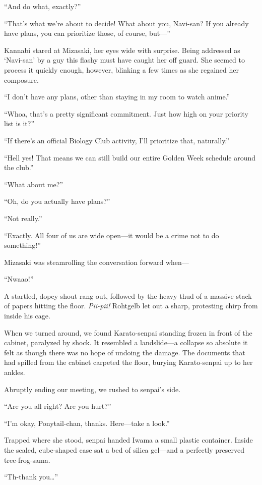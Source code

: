 \documentclass[
    a4paper,
    12pt,
    twoside,
    openany,
    UTF8,
    fontset=windows
]{ctexbook}
\begin{document}
``And do what, exactly?''

``That's what we're about to decide! What about you, Navi-san? If you already have plans, you can prioritize those, of course, but---''

Kannabi stared at Mizasaki, her eyes wide with surprise. Being addressed as `Navi-san' by a guy this flashy must have caught her off guard. She seemed to process it quickly enough, however, blinking a few times as she regained her composure.

``I don't have any plans, other than staying in my room to watch anime.''

``Whoa, that's a pretty significant commitment. Just how high on your priority list is it?''

``If there's an official Biology Club activity, I'll prioritize that, naturally.''

``Hell yes! That means we can still build our entire Golden Week schedule around the club.''

``What about me?''

``Oh, do you actually have plans?''

``Not really.''

``Exactly. All four of us are wide open---it would be a crime not to do something!''

Mizasaki was steamrolling the conversation forward when---

``Nwaao!''

A startled, dopey shout rang out, followed by the heavy thud of a massive stack of papers hitting the floor. \textit{Pii-pii!} Rohtgelb let out a sharp, protesting chirp from inside his cage.

When we turned around, we found Karato-senpai standing frozen in front of the cabinet, paralyzed by shock. It resembled a landslide---a collapse so absolute it felt as though there was no hope of undoing the damage. The documents that had spilled from the cabinet carpeted the floor, burying Karato-senpai up to her ankles.

Abruptly ending our meeting, we rushed to senpai's side.

``Are you all right? Are you hurt?''

``I'm okay, Ponytail-chan, thanks. Here---take a look.''

Trapped where she stood, senpai handed Iwama a small plastic container. Inside the sealed, cube-shaped case sat a bed of silica gel---and a perfectly preserved tree-frog-sama.

``Th-thank you\dots''
\end{document}
